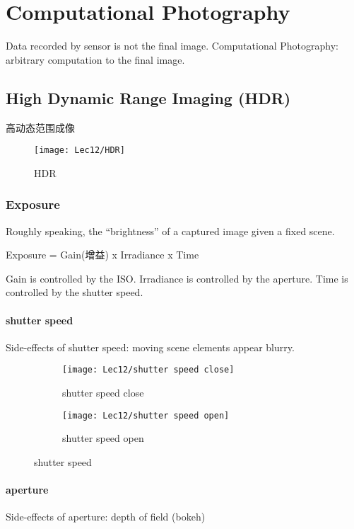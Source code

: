 \chapter{Computational Photography}

Data recorded by sensor is not the final image. Computational Photography: arbitrary computation to the final image. 

\section{High Dynamic Range Imaging (HDR)}
高动态范围成像

\begin{figure}[H]
    \centering
    \texttt{[image: Lec12/HDR]}
    \caption{HDR}
\end{figure}

\subsection{Exposure}
Roughly speaking, the “brightness” of a captured image given a fixed scene.

Exposure = Gain(增益) x Irradiance x Time

Gain is controlled by the ISO. Irradiance is controlled by the aperture. Time is controlled by the shutter speed. 

\subsubsection{shutter speed}
Side-effects of shutter speed: moving scene elements appear blurry. 

\begin{figure}[H]
    \centering
    \begin{subfigure}{0.309\textwidth}
        \centering
        \texttt{[image: Lec12/shutter speed close]}
        \caption{shutter speed close}
    \end{subfigure}
    \begin{subfigure}{0.309\textwidth}
        \centering
        \texttt{[image: Lec12/shutter speed open]}
        \caption{shutter speed open}
    \end{subfigure}
    \caption{shutter speed}
\end{figure}


\subsubsection{aperture}
Side-effects of aperture: depth of field (bokeh)

